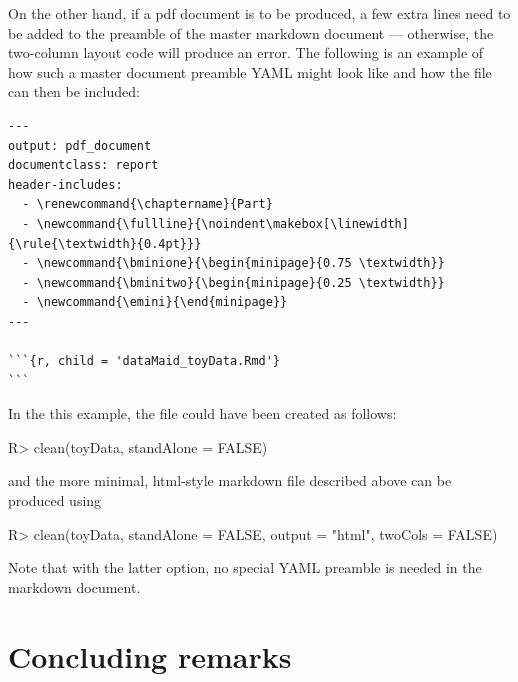 \documentclass[article,shortnames]{jss}
\newcommand{\hl}[1]{\textcolor{magenta}{#1}}
\begin{document}
On the other hand, if a pdf document is to be produced, a few extra
lines need to be added to the preamble of the master  markdown
document --- otherwise, the two-column layout code will produce an
error. The following is an example of how such a master document
preamble YAML might look like and how the  file can
then be included:

{\small
\begin{Verbatim}
---
output: pdf_document
documentclass: report
header-includes:
  - \renewcommand{\chaptername}{Part}
  - \newcommand{\fullline}{\noindent\makebox[\linewidth]{\rule{\textwidth}{0.4pt}}}
  - \newcommand{\bminione}{\begin{minipage}{0.75 \textwidth}}
  - \newcommand{\bminitwo}{\begin{minipage}{0.25 \textwidth}}
  - \newcommand{\emini}{\end{minipage}}
---

```{r, child = 'dataMaid_toyData.Rmd'}
```
\end{Verbatim}
}

In the this example, the  file could have
been created as follows:

\begin{Schunk}
\begin{Sinput}
R> clean(toyData, standAlone = FALSE)
\end{Sinput}
\end{Schunk}

and the more minimal, html-style  markdown file described above can be produced using

\begin{Schunk}
\begin{Sinput}
R> clean(toyData, standAlone = FALSE, output = "html", twoCols = FALSE)
\end{Sinput}
\end{Schunk}

Note that with the latter option, no special YAML preamble is needed in the  markdown document.



\section{Concluding remarks}
\label{conclusion}
\end{document}
